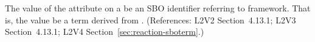 The value of the  attribute on a \Reaction {} be an SBO
identifier referring to  framework.  That is, the value 
be a term derived from \sbointeraction.  (References: L2V2 Section~4.13.1; L2V3
Section~4.13.1; L2V4 Section~\ref{sec:reaction-sboterm}.)
